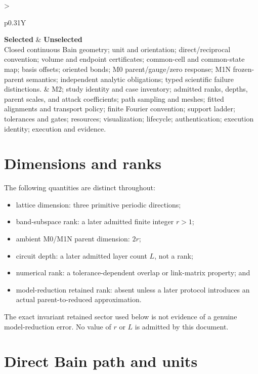 \documentclass[11pt]{article}
\begin{document}
\begin{center}\small
\begin{tabularx}{\textwidth}{>{\raggedright\arraybackslash}p{}Y}
\toprule
\textbf{Selected} & \textbf{Unselected} \\
\midrule
Closed continuous Bain geometry; unit and orientation; direct/reciprocal convention;
volume and endpoint certificates; common-cell and common-state map; basis offsets;
oriented bonds; M0 parent/gauge/zero response; M1N frozen-parent semantics; independent
analytic obligations; typed scientific failure distinctions.
& M2; study identity and case inventory; admitted ranks, depths, parent scales, and
attack coefficients; path sampling and meshes; fitted alignments and transport policy;
finite Fourier convention; support ladder; tolerances and gates; resources;
visualization; lifecycle; authentication; execution identity; execution and evidence.
\\
\bottomrule
\end{tabularx}
\end{center}

\section{Dimensions and ranks}

The following quantities are distinct throughout:
\begin{itemize}[leftmargin=*]
  \item lattice dimension: three primitive periodic directions;
  \item band-subspace rank: a later admitted finite integer $r>1$;
  \item ambient M0/M1N parent dimension: $2r$;
  \item circuit depth: a later admitted layer count $L$, not a rank;
  \item numerical rank: a tolerance-dependent overlap or link-matrix property; and
  \item model-reduction retained rank: absent unless a later protocol introduces an
    actual parent-to-reduced approximation.
\end{itemize}
The exact invariant retained sector used below is not evidence of a genuine
model-reduction error.  No value of $r$ or $L$ is admitted by this document.

\section{Direct Bain path and units}
\end{document}
